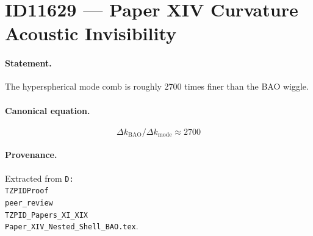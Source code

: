 \section*{ID11629 --- Paper XIV Curvature Acoustic Invisibility}

\paragraph{Statement.}
The hyperspherical mode comb is roughly 2700 times finer than the BAO wiggle.

\paragraph{Canonical equation.}
\[
\Delta k_{\mathrm{BAO}}/\Delta k_{\mathrm{mode}}\approx2700
\]

\paragraph{Provenance.}
Extracted from \texttt{D:\\TZPIDProof\\peer\_review\\TZPID\_Papers\_XI\_XIX\\Paper\_XIV\_Nested\_Shell\_BAO.tex}.

